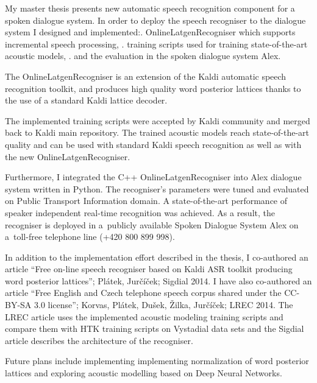 My master thesis presents new automatic speech recognition component for a spoken dialogue system.
In order to deploy the speech recogniser to the dialogue system I designed and implemented:\hfil\break\hfil{}. OnlineLatgenRecogniser which supports incremental speech processing, \hfil{}. training scripts used for training state-of-the-art acoustic models, \hfil{}. and the evaluation in the spoken dialogue system Alex.\hfil\break

The OnlineLatgenRecogniser is an extension of the Kaldi automatic speech recognition toolkit, and
produces high quality word posterior lattices thanks to the use of a standard Kaldi lattice decoder.

The implemented training scripts were accepted by Kaldi community and merged back to Kaldi main repository. 
The trained acoustic models reach state-of-the-art quality and can be used with standard Kaldi speech recognition as well as with the new OnlineLatgenRecogniser. 

Furthermore, I integrated the C++ OnlineLatgenRecogniser into Alex dialogue system written in Python. 
The recogniser's parameters were tuned and evaluated on Public Transport Information domain. 
A state-of-the-art performance of speaker independent real-time recognition was achieved. 
As a result, the recogniser is deployed in a~publicly available Spoken Dialogue System Alex on a~toll-free telephone line (+420 800 899 998).

In addition to the implementation effort described in the thesis, I co-authored an article ``Free on-line speech recogniser based on Kaldi ASR toolkit producing word posterior lattices''; Pl\'{a}tek, Jur\v{c}\'{i}\v{c}ek; Sigdial 2014. I have also co-authored an article ``Free English and Czech telephone speech corpus shared under the CC-BY-SA 3.0 license''; Korvas, Pl\'{a}tek, Du\v{s}ek, \v{Z}ilka, Jur\v{c}\'{i}\v{c}ek; LREC 2014. The LREC article uses the implemented acoustic modeling training scripts and compare them with HTK training scripts on Vystadial data sets and the Sigdial article describes the architecture of the recogniser. 

Future plans include implementing implementing normalization of word posterior lattices and exploring acoustic modelling based on Deep Neural Networks.
